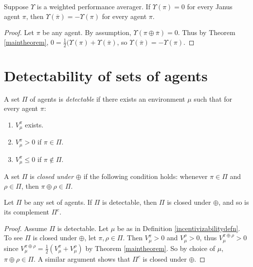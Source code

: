 \documentclass[runningheads]{llncs}
\begin{document}
\begin{theorem}
    Suppose $\Upsilon$ is a weighted performance averager.
    If $\Upsilon(\pi)=0$ for every Janus agent $\pi$,
    then $\Upsilon(\overline{\pi})=-\Upsilon(\pi)$
    for every agent $\pi$.
\end{theorem}

\begin{proof}
    Let $\pi$ be any agent.
    By assumption, $\Upsilon(\pi\oplus\overline{\pi})=0$.
    Thus by Theorem \ref{maintheorem},
    $0=\frac12(\Upsilon(\pi)+\Upsilon(\overline{\pi})$,
    so $\Upsilon(\overline{\pi})=-\Upsilon(\pi)$.
\end{proof}


\section{Detectability of sets of agents}

\begin{definition}
\label{incentivizabilitydefn}
    A set $\Pi$ of agents is \emph{detectable} if there exists
    an environment $\mu$ such that for every agent $\pi$:
    \begin{enumerate}
        \item
        $V^\pi_\mu$ exists.
        \item
        $V^\pi_\mu>0$ if $\pi\in\Pi$.
        \item
        $V^\pi_\mu\leq 0$ if $\pi\not\in\Pi$.
    \end{enumerate}
\end{definition}

\begin{definition}
    A set $\Pi$ is \emph{closed under $\oplus$} if the following
    condition holds: whenever $\pi\in\Pi$ and $\rho\in\Pi$,
    then $\pi\oplus\rho\in\Pi$.
\end{definition}

\begin{theorem}
\label{closuretheorem}
    Let $\Pi$ be any set of agents.
    If $\Pi$ is detectable, then $\Pi$ is closed under $\oplus$, and so
    is its complement $\Pi^c$.
\end{theorem}

\begin{proof}
    Assume $\Pi$ is detectable.
    Let $\mu$ be as in
    Definition \ref{incentivizabilitydefn}.
    To see $\Pi$ is closed under $\oplus$, let $\pi,\rho\in\Pi$.
    Then $V^\pi_\mu>0$ and $V^\rho_\mu>0$, thus
    $V^{\pi\oplus\rho}_\mu>0$ since
    $V^{\pi\oplus\rho}_\mu=\frac12(V^\pi_\mu+V^\rho_\mu)$ by Theorem
    \ref{maintheorem}.
    So by choice of $\mu$, $\pi\oplus\rho\in \Pi$.
    A similar argument shows that $\Pi^c$ is closed under $\oplus$.
\end{proof}
\end{document}
